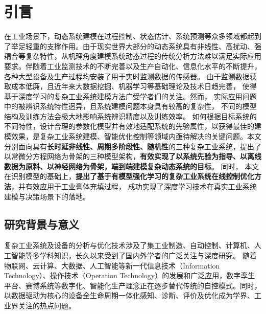 
\chapter{引言}

\setcounter{page}{1}
在工业场景下，动态系统建模在过程控制、状态估计、系统预测等众多领域都起到了举足轻重的支撑作用。由于现实世界大部分的动态系统具有非线性、高扰动、强耦合等复杂特性，从机理角度建模系统动态过程的传统分析方法难以满足实际应用要求。伴随着工业监测技术的不断完善以及生产自动化、信息化水平的不断提升，各种大型设备及生产过程均安装了用于实时监测数据的传感器。 
由于监测数据获取成本低廉，且近年来大数据挖掘、机器学习等基础理论及技术日趋完善，
使得基于深度学习的复杂工业系统建模方法广受学者们的关注。然而，
实际应用问题中的被辨识系统特性迥异，且系统建模问题本身具有较高的复杂性，
不同的模型结构及训练方法会极大地影响系统辨识精度以及训练效率。
如何根据目标系统的不同特性，设计合理的参数化模型并有效地适配系统的先验属性，以获得最佳的建模效果，是复杂工业系统建模、智能优化控制等领域内亟待解决的关键问题。本文分别面向具有\textbf{长时延非线性、周期多阶段性、随机性}的三种复杂工业系统，提出了以常微分方程网络为骨架的三种模型架构，\textbf{有效实现了以系统先验为指导、以离线数据为原料、以神经网络为骨架，端到端建模复杂动态系统的目标}。
同时，
本文在识别模型的基础上，\textbf{提出了基于有模型强化学习的复杂工业系统在线控制优化方法}，并有效应用于工业膏体充填过程，
成功实现了深度学习技术在真实工业系统建模与决策场景下的落地。
\section{研究背景与意义}

复杂工业系统及设备的分析与优化技术涉及了集工业制造、自动控制、计算机、人工智能等多学科知识，长久以来受到了国内外学者的广泛关注与深度研究。
随着物联网、云计算、大数据、人工智能等新一代信息技术（Information Technology）、操作技术（Operation Technology）的发展和广泛应用，数字孪生平台、赛博系统等数字化、智能化生产理念正在逐步替代传统的自控模式。同时，以数据驱动为核心的设备全生命周期一体化感知、诊断、评价及优化成为学界、工业界关注的热点问题。

